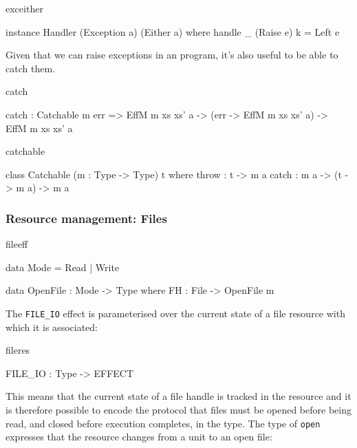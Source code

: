\begin{SaveVerbatim}{exceither}

instance Handler (Exception a) (Either a) where
     handle _ (Raise e) k = Left e

\end{SaveVerbatim}

Given that we can raise exceptions in an \Eff{} program, it's also useful to be
able to catch them.

\begin{SaveVerbatim}{catch}

catch : Catchable m err =>
        EffM m xs xs' a -> (err -> EffM m xs xs' a) ->
        EffM m xs xs' a

\end{SaveVerbatim}

\begin{SaveVerbatim}{catchable}

class Catchable (m : Type -> Type) t where
    throw : t -> m a
    catch : m a -> (t -> m a) -> m a

\end{SaveVerbatim}



\subsubsection{Resource management: Files}

\begin{SaveVerbatim}{fileeff}

data Mode = Read | Write

data OpenFile : Mode -> Type where
     FH : File -> OpenFile m

\end{SaveVerbatim}

\noindent
The \texttt{FILE\_IO} effect is parameterised over the current state of a
file resource with which it is associated:

\begin{SaveVerbatim}{fileres}

FILE_IO : Type -> EFFECT

\end{SaveVerbatim}

\noindent
This means that the current state of a file handle is tracked in the resource
and it is therefore possible to encode the protocol that files must be opened
before being read, and closed before execution completes, in the type.
The type of \texttt{open} expresses that the resource changes from a unit
to an open file:

